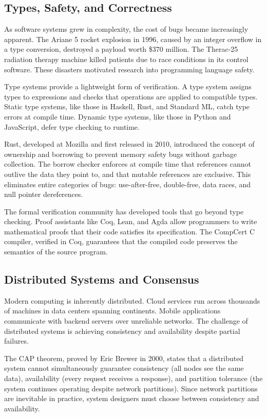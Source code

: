\documentclass[11pt]{article}
\begin{document}
\subsection{Types, Safety, and Correctness}

As software systems grew in complexity, the cost of bugs became increasingly
apparent. The Ariane 5 rocket explosion in 1996, caused by an integer overflow
in a type conversion, destroyed a payload worth \$370 million. The Therac-25
radiation therapy machine killed patients due to race conditions in its
control software. These disasters motivated research into programming
language safety.

Type systems provide a lightweight form of verification. A type system
assigns types to expressions and checks that operations are applied to
compatible types. Static type systems, like those in Haskell, Rust, and
Standard ML, catch type errors at compile time. Dynamic type systems, like
those in Python and JavaScript, defer type checking to runtime.

Rust, developed at Mozilla and first released in 2010, introduced the concept
of ownership and borrowing to prevent memory safety bugs without garbage
collection. The borrow checker enforces at compile time that references
cannot outlive the data they point to, and that mutable references are
exclusive. This eliminates entire categories of bugs: use-after-free,
double-free, data races, and null pointer dereferences.

The formal verification community has developed tools that go beyond type
checking. Proof assistants like Coq, Lean, and Agda allow programmers to
write mathematical proofs that their code satisfies its specification.
The CompCert C compiler, verified in Coq, guarantees that the compiled
code preserves the semantics of the source program.

\subsection{Distributed Systems and Consensus}

Modern computing is inherently distributed. Cloud services run across
thousands of machines in data centers spanning continents. Mobile
applications communicate with backend servers over unreliable networks.
The challenge of distributed systems is achieving consistency and
availability despite partial failures.

The CAP theorem, proved by Eric Brewer in 2000, states that a distributed
system cannot simultaneously guarantee consistency (all nodes see the same
data), availability (every request receives a response), and partition
tolerance (the system continues operating despite network partitions).
Since network partitions are inevitable in practice, system designers must
choose between consistency and availability.
\end{document}
